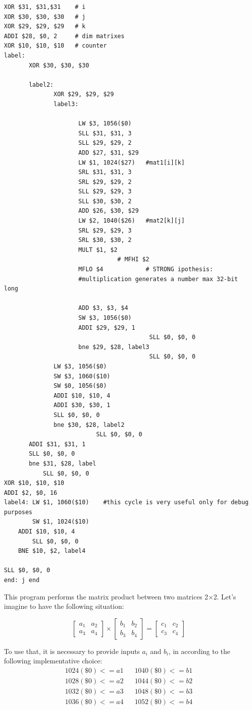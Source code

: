 \documentclass[a4paper,twoside]{article}
\theoremstyle{definition}
\theoremstyle{remark}
\begin{document}
\begin{lstlisting}
XOR $31, $31,$31	# i
XOR $30, $30, $30	# j
XOR $29, $29, $29	# k
ADDI $28, $0, 2		# dim matrixes 
XOR $10, $10, $10	# counter
label: 
	   XOR $30, $30, $30
	   
	   label2:
			  XOR $29, $29, $29
			  label3:
					 
					 LW $3, 1056($0)
					 SLL $31, $31, 3
					 SLL $29, $29, 2
					 ADD $27, $31, $29
					 LW $1, 1024($27)	#mat1[i][k] 
					 SRL $31, $31, 3
					 SRL $29, $29, 2
					 SLL $29, $29, 3
					 SLL $30, $30, 2
					 ADD $26, $30, $29
					 LW $2, 1040($26)	#mat2[k][j] 
					 SRL $29, $29, 3
					 SRL $30, $30, 2
					 MULT $1, $2
					 			# MFHI $2
					 MFLO $4	        # STRONG ipothesis: 
					 #multiplication generates a number max 32-bit long
					 
					 ADD $3, $3, $4		
					 SW $3, 1056($0)
					 ADDI $29, $29, 1	
                                         SLL $0, $0, 0
					 bne $29, $28, label3   
                                         SLL $0, $0, 0
			  LW $3, 1056($0)
			  SW $3, 1060($10) 
 			  SW $0, 1056($0)
			  ADDI $10, $10, 4
			  ADDI $30, $30, 1	
			  SLL $0, $0, 0
			  bne $30, $28, label2
                          SLL $0, $0, 0
	   ADDI $31, $31, 1
	   SLL $0, $0, 0
	   bne $31, $28, label
           SLL $0, $0, 0	
XOR $10, $10, $10
ADDI $2, $0, 16
label4:	LW $1, 1060($10)	#this cycle is very useful only for debug purposes
        SW $1, 1024($10)
	ADDI $10, $10, 4
        SLL $0, $0, 0
	BNE $10, $2, label4

SLL $0, $0, 0		
end: j end
\end{lstlisting}

This program performs the matrix product between two matrices 2$\times$2. Let's 
imagine to have the following situation:

\begin{equation*}
\begin{bmatrix}
a_1 & a_2 \\ 
a_3 & a_4
\end{bmatrix}
\times
\begin{bmatrix}
b_1 & b_2 \\ 
b_3 & b_4
\end{bmatrix}
=
\begin{bmatrix}
c_1 & c_2 \\ 
c_3 & c_4
\end{bmatrix}
\end{equation*}

To use that, it is necessary to provide inputs $a_i$ and $b_i$, in according to the 
following implementative choice:
\begin{align*}
1024(\$0) <= a1 & & 1040(\$0) <= b1\\
1028(\$0) <= a2 & & 1044(\$0) <= b2\\
1032(\$0) <= a3 & & 1048(\$0) <= b3\\
1036(\$0) <= a4 & & 1052(\$0) <= b4\\
\end{align*}
\end{document}

